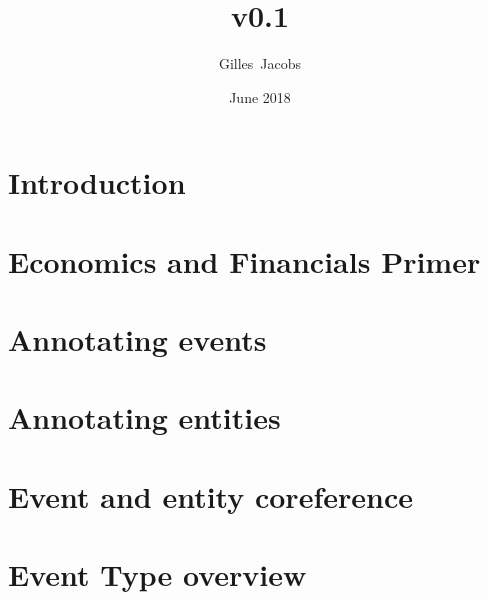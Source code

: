 \documentclass[a4paper]{report}
\title{\scheme v0.1}
\author{Gilles~Jacobs}
\date{June 2018}
\begin{document}
\maketitle
\tableofcontents
\newpage

\chapter{Introduction}


\chapter{Economics and Financials Primer}


\chapter{Annotating events}
\label{chapter/events}


\chapter{Annotating entities}
\label{chapter/entities}


\chapter{Event and entity coreference}
\label{chapter/coref}


\chapter{Event Type overview}
\label{chapter/eventtype}


\printbibliography

% 
\end{document}
